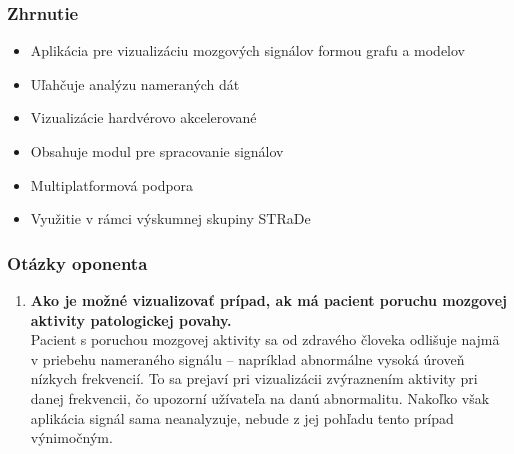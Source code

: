 \documentclass{beamer}
\begin{document}
\begin{frame}
	\frametitle{Zhrnutie}
	\begin{itemize}
		\item Aplikácia pre vizualizáciu mozgových signálov formou grafu a modelov
		\item Uľahčuje analýzu nameraných dát 
		\item Vizualizácie hardvérovo akcelerované
		\item Obsahuje modul pre spracovanie signálov
		\item Multiplatformová podpora
		\item Využitie v rámci výskumnej skupiny STRaDe
	\end{itemize}
\end{frame}

\begin{frame}
	\frametitle{Otázky oponenta}
	\begin{enumerate}
		\item \textbf{Ako je možné vizualizovať prípad, ak má pacient poruchu mozgovej aktivity patologickej povahy.}\\
		Pacient s poruchou mozgovej aktivity sa od zdravého človeka odlišuje najmä v priebehu nameraného signálu -- napríklad abnormálne vysoká úroveň nízkych frekvencií. To sa prejaví pri vizualizácii zvýraznením aktivity pri danej frekvencii, čo upozorní užívateľa na danú abnormalitu. Nakoľko však aplikácia signál sama neanalyzuje, nebude z jej pohľadu tento prípad výnimočným.
	\end{enumerate}
\end{frame}
\end{document}
